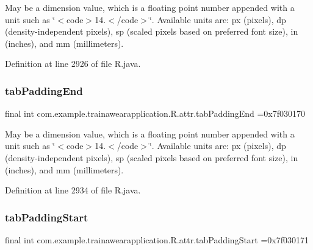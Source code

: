 May be a dimension value, which is a floating point number appended with a unit such as \char`\"{}$<$code$>$14.\+5sp$<$/code$>$\char`\"{}. Available units are\+: px (pixels), dp (density-\/independent pixels), sp (scaled pixels based on preferred font size), in (inches), and mm (millimeters). 

Definition at line 2926 of file R.\+java.

\mbox{\label{classcom_1_1example_1_1trainawearapplication_1_1_r_1_1attr_a034c23069692bab8f23351e9e226686e}} 
\subsubsection{\texorpdfstring{tabPaddingEnd}{tabPaddingEnd}}
{\footnotesize\ttfamily final int com.\+example.\+trainawearapplication.\+R.\+attr.\+tab\+Padding\+End =0x7f030170\hspace{0.3cm}{\ttfamily [static]}}

May be a dimension value, which is a floating point number appended with a unit such as \char`\"{}$<$code$>$14.\+5sp$<$/code$>$\char`\"{}. Available units are\+: px (pixels), dp (density-\/independent pixels), sp (scaled pixels based on preferred font size), in (inches), and mm (millimeters). 

Definition at line 2934 of file R.\+java.

\mbox{\label{classcom_1_1example_1_1trainawearapplication_1_1_r_1_1attr_afba258ee57f4c1de5a01ad540f1713e0}} 
\subsubsection{\texorpdfstring{tabPaddingStart}{tabPaddingStart}}
{\footnotesize\ttfamily final int com.\+example.\+trainawearapplication.\+R.\+attr.\+tab\+Padding\+Start =0x7f030171\hspace{0.3cm}{\ttfamily [static]}}

